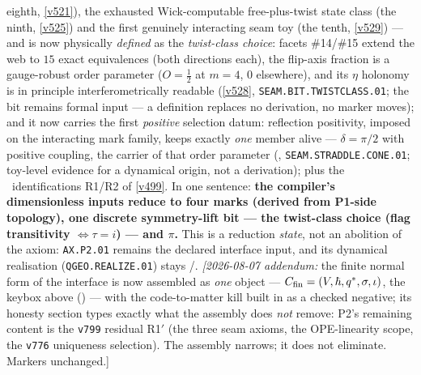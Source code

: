 \documentclass[11pt,a4paper]{article}
\theoremstyle{definition}
\begin{document}
\begin{keybox}
eighth, \vref{v521}), the exhausted Wick-computable free-plus-twist state class (the ninth,
\vref{v525}) and the first genuinely interacting seam toy (the tenth, \vref{v529}) --- and is now
physically \emph{defined} as the \emph{twist-class choice}: facets \#14/\#15 extend the web to
$15$ exact equivalences (both directions each), the flip-axis fraction is a gauge-robust order
parameter ($O=\tfrac12$ at $m=4$, $0$ elsewhere), and its $\eta$ holonomy is in principle
interferometrically readable (\vref{v528}, \texttt{SEAM.BIT.TWISTCLASS.01}; the bit remains
formal input --- a definition replaces no derivation, no marker moves); and it now carries the
first \emph{positive} selection datum: reflection positivity, imposed on the interacting mark
family, keeps exactly \emph{one} member alive --- $\delta=\pi/2$ with positive coupling, the
carrier of that order parameter (,
\texttt{SEAM.STRADDLE.CONE.01}; toy-level evidence for a dynamical origin, not a derivation);
plus the \mC\
identifications R1/R2
of \vref{v499}. In one sentence: \textbf{the compiler's dimensionless inputs reduce to four marks
(derived from P1-side topology), one discrete symmetry-lift bit --- the twist-class choice (flag
transitivity $\iff\tau=i$) --- and $\pi$.} This is a reduction \emph{state}, not an abolition of
the axiom: \texttt{AX.P2.01} remains the declared interface input, and its dynamical realisation
(\texttt{QGEO.REALIZE.01}) stays \mC/\mO.
\emph{[2026-08-07 addendum:} the finite normal form of the interface is now assembled as
\emph{one} object --- $C_{\rm fin}=(V,\hbar,q^{*},\sigma,\iota)$, the keybox above
(\veri{v845\_cfin\_normal\_form.py}) --- with the code-to-matter kill built in as a checked
negative; its honesty section types exactly what the assembly does \emph{not} remove: P2's
remaining content is the \texttt{v799} residual R1$'$ (the three seam axioms, the OPE-linearity
scope, the \texttt{v776} uniqueness selection).  The assembly narrows; it does not eliminate.
Markers unchanged.]
\end{keybox}
\end{document}
